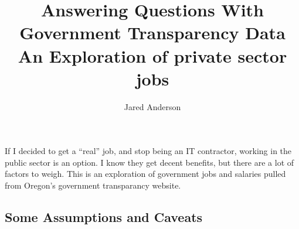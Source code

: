 \documentclass[letterpaper]{article}
\author{Jared Anderson}
\theoremstyle{definition}
\begin{document}
		
\title{
	Answering Questions With Government Transparency Data\\
	\large An Exploration of private sector jobs
}

\maketitle
    
    

    
If I decided to get a ``real'' job, and stop being an IT contractor,
working in the public sector is an option. I know they get decent
benefits, but there are a lot of factors to weigh. This is an
exploration of government jobs and salaries pulled from Oregon's
government transparancy website.

\hypertarget{some-assumptions-and-caveats}{%
\subsection{Some Assumptions and
Caveats}\label{some-assumptions-and-caveats}}
\end{document}
